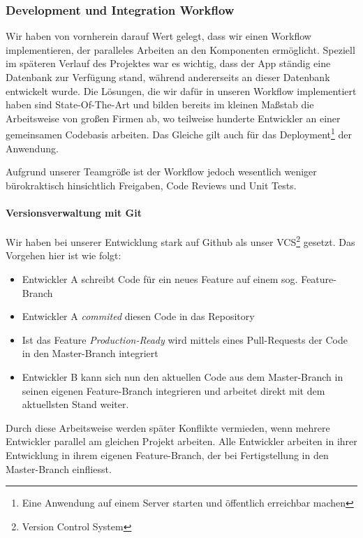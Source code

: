 \documentclass[titlepage, a4paper, 11pt]{scrartcl}
\begin{document}
      \subsubsection{Development und Integration Workflow}

        Wir haben von vornherein darauf Wert gelegt, dass wir einen Workflow implementieren, der paralleles Arbeiten an den Komponenten ermöglicht.
        Speziell im späteren Verlauf des Projektes war es wichtig, dass der App ständig eine Datenbank zur Verfügung stand, während andererseits an dieser Datenbank entwickelt wurde.
        Die Lösungen, die wir dafür in unseren Workflow implementiert haben sind State-Of-The-Art und bilden bereits im kleinen Maßstab die Arbeitsweise von großen Firmen
        ab, wo teilweise hunderte Entwickler an einer gemeinsamen Codebasis arbeiten. Das Gleiche gilt auch für das Deployment\footnote{Eine Anwendung auf einem Server starten und öffentlich erreichbar machen} 
        der Anwendung.

        Aufgrund unserer Teamgröße ist der Workflow jedoch wesentlich weniger bürokraktisch hinsichtlich Freigaben, Code Reviews und Unit Tests.

        \paragraph{Versionsverwaltung mit Git}

          Wir haben bei unserer Entwicklung stark auf Github als unser VCS\footnote{Version Control System} gesetzt. Das Vorgehen hier ist wie folgt:

          \begin{itemize}
            \item Entwickler A schreibt Code für ein neues Feature auf einem sog. Feature-Branch
            \item Entwickler A \textit{commited} diesen Code in das Repository
            \item Ist das Feature \textit{Production-Ready} wird mittels eines Pull-Requests der Code in den Master-Branch integriert
            \item Entwickler B kann sich nun den aktuellen Code aus dem Master-Branch in seinen eigenen Feature-Branch integrieren und arbeitet direkt mit dem aktuellsten Stand weiter.
          \end{itemize}

          Durch diese Arbeitsweise werden später Konflikte vermieden, wenn mehrere Entwickler parallel am gleichen Projekt arbeiten.
          Alle Entwickler arbeiten in ihrer Entwicklung in ihrem eigenen Feature-Branch, der bei Fertigstellung in den Master-Branch einfliesst.
\end{document}
